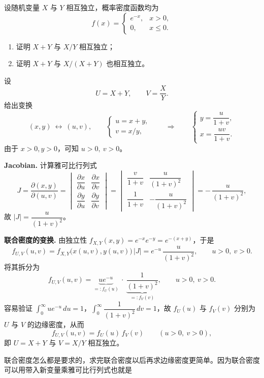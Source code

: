 \begin{homework}[61]
设随机变量 $X$ 与 $Y$ 相互独立，概率密度函数均为
\[
f(x)=
\begin{cases}
e^{-x}, & x>0,\\[4pt]
0, & x\le 0.
\end{cases}
\]
\begin{enumerate}[(1)]
  \item 证明 $X+Y$ 与 $X/Y$ 相互独立；
  \item 证明 $X+Y$ 与 $X/(X+Y)$ 也相互独立。
\end{enumerate}
\end{homework}
\begin{solution}
设
\[
U=X+Y,\qquad V=\frac{X}{Y}.
\]
给出变换
\[
(x,y)\ \longleftrightarrow\ (u,v),\qquad 
\begin{cases}
u=x+y,\\[2pt]
v=x/y,
\end{cases}
\qquad\Longrightarrow\qquad
\begin{cases}
y=\dfrac{u}{1+v},\\[8pt]
x=\dfrac{uv}{1+v}.
\end{cases}
\]
由于 $x>0,y>0$，可知 $u>0,\ v>0$。

\medskip
\noindent\textbf{Jacobian.} 计算雅可比行列式
\[
J=\frac{\partial(x,y)}{\partial(u,v)}
=\begin{vmatrix}
\dfrac{\partial x}{\partial u} & \dfrac{\partial x}{\partial v}\\[8pt]
\dfrac{\partial y}{\partial u} & \dfrac{\partial y}{\partial v}
\end{vmatrix}
=\begin{vmatrix}
\dfrac{v}{1+v} & \dfrac{u}{(1+v)^2}\\[10pt]
\dfrac{1}{1+v} & -\dfrac{u}{(1+v)^2}
\end{vmatrix}
=-\,\frac{u}{(1+v)^2},
\]
故 $|J|=\dfrac{u}{(1+v)^2}$。

\medskip
\noindent\textbf{联合密度的变换.} 由独立性 $f_{X,Y}(x,y)=e^{-x}e^{-y}=e^{-(x+y)}$，于是
\[
f_{U,V}(u,v)
=f_{X,Y}\!\bigl(x(u,v),y(u,v)\bigr)\,|J|
=e^{-u}\,\frac{u}{(1+v)^2},\qquad u>0,\ v>0.
\]
将其拆分为
\[
f_{U,V}(u,v)=\underbrace{u e^{-u}}_{=:f_U(u)}\ \cdot\ 
\underbrace{\frac{1}{(1+v)^2}}_{=:f_V(v)},\qquad u>0,\ v>0.
\]
容易验证 $\int_0^\infty u e^{-u}\,du=1$，$\int_0^\infty \dfrac{1}{(1+v)^2}\,dv=1$，故
$f_U(u)$ 与 $f_V(v)$ 分别为 $U$ 与 $V$ 的边缘密度，从而
\[
f_{U,V}(u,v)=f_U(u)\,f_V(v)\qquad(u>0,\ v>0),
\]
即 $U=X+Y$ 与 $V=X/Y$ 相互独立。
\end{solution}
\begin{dxtips}
    联合密度怎么都是要求的，求完联合密度以后再求边缘密度更简单。因为联合密度可以用带入新变量乘雅可比行列式也就是
\end{dxtips}
